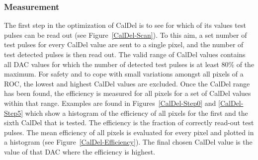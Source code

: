 \documentclass[a4paper,12pt,twoside]{article}
\begin{document}
\subsubsection{Measurement}
The first step in the optimization of CalDel is to see for which of its values test pulses can be read out (see Figure~\ref{CalDel-Scan}). To this aim, a set number of test pulses for every CalDel value are sent to a single pixel, and the number of test detected pulses is then read out. The valid range of CalDel values contains all DAC values for which the number of detected test pulses is at least 80\% of the maximum. For safety and to cope with small variations amongst all pixels of a ROC, the lowest and highest CalDel values are excluded. Once the CalDel range has been found, the efficiency is measured for all pixels for a set of CalDel values within that range. Examples are found in Figures~\ref{CalDel-Step0} and \ref{CalDel-Step5} which show a histogram of the efficiency of all pixels for the first and the sixth CalDel that is tested. The efficiency is the fraction of correctly read-out test pulses. The mean efficiency of all pixels is evaluated for every pixel and plotted in a histogram (see Figure~\ref{CalDel-Efficiency}). The final chosen CalDel value is the value of that DAC where the efficiency is highest.
\end{document}
